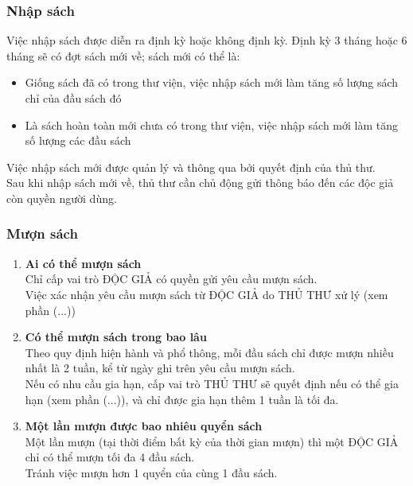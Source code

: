 \documentclass[12pt,a4paper]{report}
\begin{document}
			\subsubsection{Nhập sách}
			Việc nhập sách được diễn ra định kỳ hoặc không định kỳ. Định kỳ 3 tháng hoặc 6 tháng sẽ có đợt sách mới về; sách mới có thể là:
			\begin{itemize}
				\item Giống sách đã có trong thư viện, việc nhập sách mới làm tăng số lượng sách chỉ của đầu sách đó
				\item Là sách hoàn toàn mới chưa có trong thư viện, việc nhập sách mới làm tăng số lượng các đầu sách
			\end{itemize}
			Việc nhập sách mới được quản lý và thông qua bởi quyết định của thủ thư.\\
			Sau khi nhập sách mới về, thủ thư cần chủ động gửi thông báo đến các độc giả còn quyền người dùng.\\

			\subsubsection{Mượn sách}
				\begin{enumerate}
				\item \textbf{Ai có thể mượn sách}\\
				Chỉ cấp vai trò ĐỘC GIẢ có quyền gửi yêu cầu mượn sách.\\
				Việc xác nhận yêu cầu mượn sách từ ĐỘC GIẢ do THỦ THƯ xử lý (xem phần (...))\\
				\item \textbf{Có thể mượn sách trong bao lâu}\\
				Theo quy định hiện hành và phổ thông, mỗi đầu sách chỉ được mượn nhiều nhất là 2 tuần, kể từ ngày ghi trên yêu cầu mượn sách.\\
				Nếu có nhu cầu gia hạn, cấp vai trò THỦ THƯ sẽ quyết định nếu có thể gia hạn (xem phần (...)), và chỉ được gia hạn thêm 1 tuần là tối đa.\\
				\item \textbf{Một lần mượn được bao nhiêu quyển sách}\\
				Một lần mượn (tại thời điểm bất kỳ của thời gian mượn) thì một ĐỘC GIẢ chỉ có thể mượn tối đa 4 đầu sách.\\
				Tránh việc mượn hơn 1 quyển của cùng 1 đầu sách.\\
				\end{enumerate}
\end{document}
